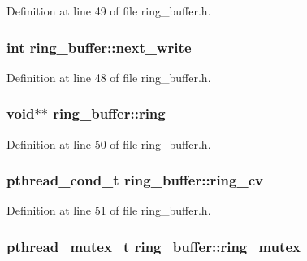 Definition at line 49 of file ring\+\_\+buffer.\+h.

\hypertarget{structring__buffer_af3f14937423dc6d693444d550b498c12}{}
\subsubsection[{next\+\_\+write}]{\setlength{\rightskip}{0pt plus 5cm}int ring\+\_\+buffer\+::next\+\_\+write}\label{structring__buffer_af3f14937423dc6d693444d550b498c12}


Definition at line 48 of file ring\+\_\+buffer.\+h.

\hypertarget{structring__buffer_a9c694810d59531a5725341dc33d02445}{}
\subsubsection[{ring}]{\setlength{\rightskip}{0pt plus 5cm}void$\ast$$\ast$ ring\+\_\+buffer\+::ring}\label{structring__buffer_a9c694810d59531a5725341dc33d02445}


Definition at line 50 of file ring\+\_\+buffer.\+h.

\hypertarget{structring__buffer_add8eae2fb8095b3a680d40f77e4ccf14}{}
\subsubsection[{ring\+\_\+cv}]{\setlength{\rightskip}{0pt plus 5cm}pthread\+\_\+cond\+\_\+t ring\+\_\+buffer\+::ring\+\_\+cv}\label{structring__buffer_add8eae2fb8095b3a680d40f77e4ccf14}


Definition at line 51 of file ring\+\_\+buffer.\+h.

\hypertarget{structring__buffer_a02f5f67c7cfb2d9af345d3b2a4763706}{}
\subsubsection[{ring\+\_\+mutex}]{\setlength{\rightskip}{0pt plus 5cm}pthread\+\_\+mutex\+\_\+t ring\+\_\+buffer\+::ring\+\_\+mutex}\label{structring__buffer_a02f5f67c7cfb2d9af345d3b2a4763706}


